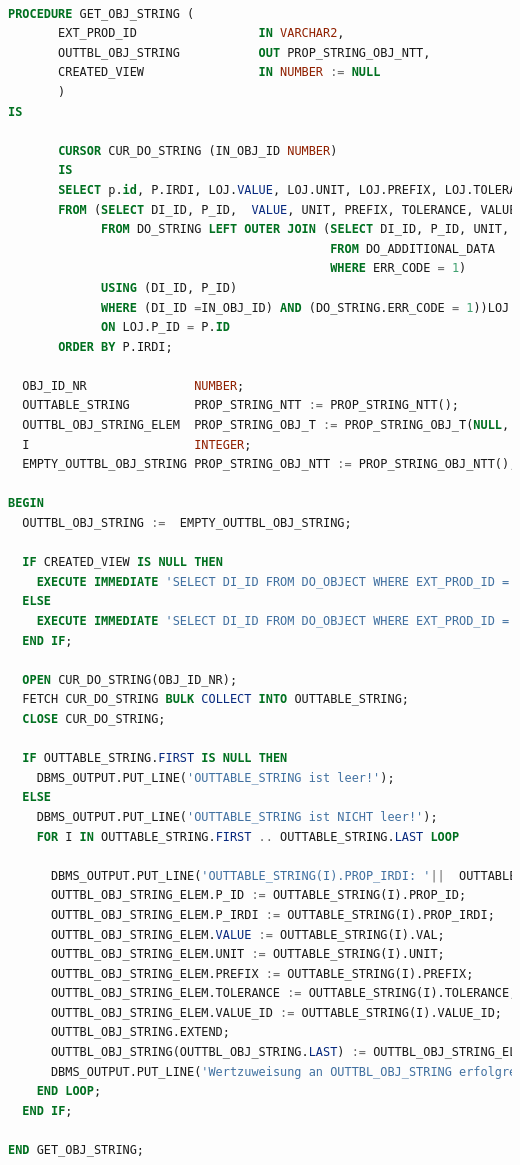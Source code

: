  \begin{lstlisting}[caption=GET\_OBJ\_STRING Anpassung auf Property ID, language=sql, label=lst:get_obj_string_anpassung]

PROCEDURE GET_OBJ_STRING (
       EXT_PROD_ID                 IN VARCHAR2,
       OUTTBL_OBJ_STRING           OUT PROP_STRING_OBJ_NTT,
       CREATED_VIEW                IN NUMBER := NULL
       )
IS
       
       CURSOR CUR_DO_STRING (IN_OBJ_ID NUMBER) 
       IS
       SELECT p.id, P.IRDI, LOJ.VALUE, LOJ.UNIT, LOJ.PREFIX, LOJ.TOLERANCE, LOJ.VALUE_ID 
       FROM (SELECT DI_ID, P_ID,  VALUE, UNIT, PREFIX, TOLERANCE, VALUE_ID 
             FROM DO_STRING LEFT OUTER JOIN (SELECT DI_ID, P_ID, UNIT, PREFIX, TOLERANCE, VALUE_ID
                                             FROM DO_ADDITIONAL_DATA 
                                             WHERE ERR_CODE = 1)
             USING (DI_ID, P_ID) 
             WHERE (DI_ID =IN_OBJ_ID) AND (DO_STRING.ERR_CODE = 1))LOJ JOIN DE_PROPERTY P
             ON LOJ.P_ID = P.ID
       ORDER BY P.IRDI;      
 
  OBJ_ID_NR               NUMBER;
  OUTTABLE_STRING         PROP_STRING_NTT := PROP_STRING_NTT();
  OUTTBL_OBJ_STRING_ELEM  PROP_STRING_OBJ_T := PROP_STRING_OBJ_T(NULL, NULL, NULL, NULL, NULL, NULL, NULL);
  I                       INTEGER;
  EMPTY_OUTTBL_OBJ_STRING PROP_STRING_OBJ_NTT := PROP_STRING_OBJ_NTT();

BEGIN
  OUTTBL_OBJ_STRING :=  EMPTY_OUTTBL_OBJ_STRING;
   
  IF CREATED_VIEW IS NULL THEN
    EXECUTE IMMEDIATE 'SELECT DI_ID FROM DO_OBJECT WHERE EXT_PROD_ID = ''' || EXT_PROD_ID || ''' AND CREATED_VIEW IS NULL' INTO OBJ_ID_NR;
  ELSE
    EXECUTE IMMEDIATE 'SELECT DI_ID FROM DO_OBJECT WHERE EXT_PROD_ID = ''' || EXT_PROD_ID || ''' AND CREATED_VIEW = ' || CREATED_VIEW INTO OBJ_ID_NR ;
  END IF;
      
  OPEN CUR_DO_STRING(OBJ_ID_NR);
  FETCH CUR_DO_STRING BULK COLLECT INTO OUTTABLE_STRING; 
  CLOSE CUR_DO_STRING; 
  
  IF OUTTABLE_STRING.FIRST IS NULL THEN
    DBMS_OUTPUT.PUT_LINE('OUTTABLE_STRING ist leer!');
  ELSE 
    DBMS_OUTPUT.PUT_LINE('OUTTABLE_STRING ist NICHT leer!');
    FOR I IN OUTTABLE_STRING.FIRST .. OUTTABLE_STRING.LAST LOOP
      
      DBMS_OUTPUT.PUT_LINE('OUTTABLE_STRING(I).PROP_IRDI: '||  OUTTABLE_STRING(I).PROP_IRDI);
      OUTTBL_OBJ_STRING_ELEM.P_ID := OUTTABLE_STRING(I).PROP_ID;
      OUTTBL_OBJ_STRING_ELEM.P_IRDI := OUTTABLE_STRING(I).PROP_IRDI;
      OUTTBL_OBJ_STRING_ELEM.VALUE := OUTTABLE_STRING(I).VAL;
      OUTTBL_OBJ_STRING_ELEM.UNIT := OUTTABLE_STRING(I).UNIT;
      OUTTBL_OBJ_STRING_ELEM.PREFIX := OUTTABLE_STRING(I).PREFIX;
      OUTTBL_OBJ_STRING_ELEM.TOLERANCE := OUTTABLE_STRING(I).TOLERANCE;
      OUTTBL_OBJ_STRING_ELEM.VALUE_ID := OUTTABLE_STRING(I).VALUE_ID;
      OUTTBL_OBJ_STRING.EXTEND;
      OUTTBL_OBJ_STRING(OUTTBL_OBJ_STRING.LAST) := OUTTBL_OBJ_STRING_ELEM;
      DBMS_OUTPUT.PUT_LINE('Wertzuweisung an OUTTBL_OBJ_STRING erfolgreich!');
    END LOOP; 
  END IF;
   
END GET_OBJ_STRING;
\end{lstlisting}
 
